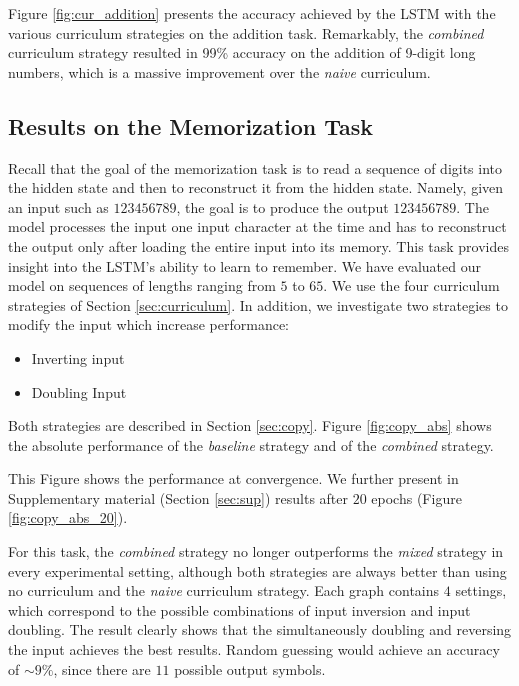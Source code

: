 \label{sec:add_res}

Figure \ref{fig:cur_addition} presents the accuracy achieved by the LSTM with the various curriculum strategies on the addition task.  Remarkably, the \textit{combined} curriculum strategy resulted in
99\% accuracy on the addition of 9-digit long numbers, which is a massive improvement over the \textit{naive} curriculum. 

\subsection{Results on the Memorization Task}

Recall that the goal of the memorization task is to read a sequence of digits into the hidden state and then to reconstruct it from the hidden state. Namely, given an input such as $123456789$, the goal is to produce the output $123456789$. The model processes the input one input character at the time and has to reconstruct the output only after loading the entire input into its memory. This task provides insight into the LSTM's ability to learn to remember.  We have evaluated our model on sequences of lengths ranging from $5$ to $65$. We use the four curriculum strategies of Section \ref{sec:curriculum}. In addition, we investigate two strategies to modify the input which increase performance:

\begin{itemize}
  \item Inverting input \citep{sutskever2014sequence}
  \item Doubling Input
\end{itemize}

Both strategies are described in Section \ref{sec:copy}. Figure \ref{fig:copy_abs} shows the absolute performance of the \textit{baseline} strategy and of the \textit{combined} strategy. 

This Figure shows the performance at convergence.  We further present in Supplementary material (Section \ref{sec:sup}) results after $20$ epochs (Figure \ref{fig:copy_abs_20}).

For this task, the \textit{combined} strategy no longer outperforms the \textit{mixed} strategy in every experimental setting, although both strategies are always better than using no curriculum and the \textit{naive} curriculum strategy. Each graph contains $4$ settings, which correspond to the possible combinations of input inversion and input doubling.  The result clearly shows that the simultaneously doubling and reversing the input achieves the best results.  Random guessing would achieve an accuracy of $\sim 9\%$, since there are $11$ possible output symbols.
\label{sec:copy_res}

